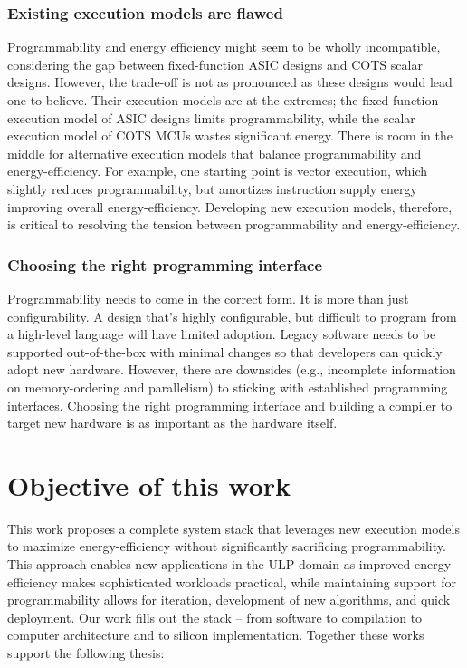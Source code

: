 \subsubsection{Existing execution models are flawed}
Programmability and energy efficiency might seem to be wholly incompatible, considering the gap between fixed-function ASIC designs and COTS scalar designs.
% 
However, the trade-off is not as pronounced as these designs
would lead one to believe.
% 
Their execution models are at the extremes; the fixed-function execution model of ASIC designs limits programmability, while the scalar execution model of COTS MCUs wastes significant energy.
% 
There is room in the middle for alternative execution models that balance programmability and energy-efficiency.
% 
For example, one starting point is vector execution, which slightly reduces programmability, but amortizes instruction supply energy improving overall energy-efficiency.
% 
Developing new execution models, therefore, is critical to resolving the tension between programmability and energy-efficiency.

\subsubsection{Choosing the right programming interface}
Programmability needs to come in the correct form.
% 
It is more than just configurability.
% 
A design that's highly configurable, but difficult to program from a high-level language will have limited adoption.
% 
Legacy software needs to be supported out-of-the-box with minimal changes so that developers can quickly adopt new hardware.
% 
However, there are downsides (e.g., incomplete information on memory-ordering and parallelism) to sticking with established programming interfaces.
% 
Choosing the right programming interface and building a compiler to target new hardware is as important as the hardware itself.


\figOverview

\section{Objective of this work}

This work proposes a complete system stack that leverages new execution models to maximize energy-efficiency without significantly sacrificing programmability.
% 
This approach enables new applications in the ULP domain as improved energy efficiency makes sophisticated workloads practical, while maintaining support for programmability allows for iteration, development of new algorithms, and quick deployment. 
% 
Our work fills out the stack -- from software to compilation to computer architecture and to silicon implementation.
% 
Together these works support the following thesis:

